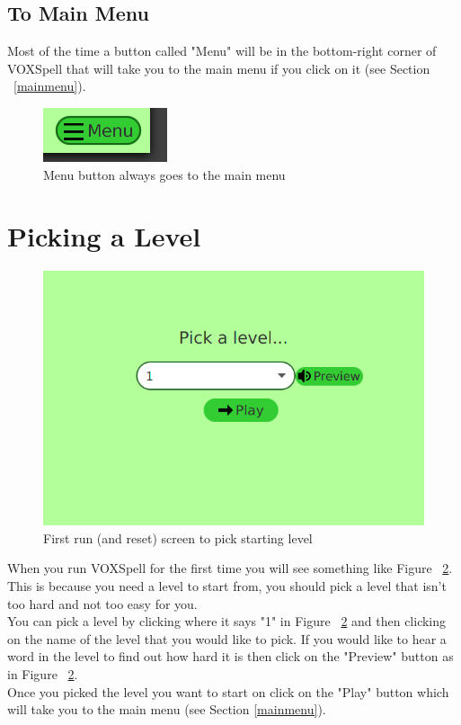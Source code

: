 \documentclass[12pt,a4paper,titlepage,onecolumn]{article}
\begin{document}
	\subsection{To Main Menu}
	Most of the time a button called "Menu" will be in the bottom-right corner of VOXSpell that will take you to the main menu if you click on it (see Section ~\ref{mainmenu}).
	\begin{figure}[h]
		\centering
		\includegraphics[width=0.2\linewidth]{Figures/Introduction/Menu}
		\caption[Menu Button]{Menu button always goes to the main menu}
		\label{fig:Menu}
	\end{figure}
	
	
	
	\section{Picking a Level}\label{picklevel}
	\begin{figure}[h]
		\centering
		\includegraphics[width=1\linewidth]{"Figures/Picking a Level/PickLevelGeneral"}
		\caption[PickLevel]{First run (and reset) screen to pick starting level}
		\label{fig:PickLevelGeneral}
	\end{figure}
	
	When you run VOXSpell for the first time you will see something like Figure ~\ref{fig:PickLevelGeneral}. This is because you need a level to start from, you should pick a level that isn't too hard and not too easy for you. \\
	You can pick a level by clicking where it says "1" in Figure ~\ref{fig:PickLevelGeneral} and then clicking on the name of the level that you would like to pick. If you would like to hear a word in the level to find out how hard it is then click on the "Preview" button as in Figure ~\ref{fig:PickLevelGeneral}.\\
	Once you picked the level you want to start on click on the "Play" button which will take you to the main menu (see Section \ref{mainmenu}).
	
\end{document}
